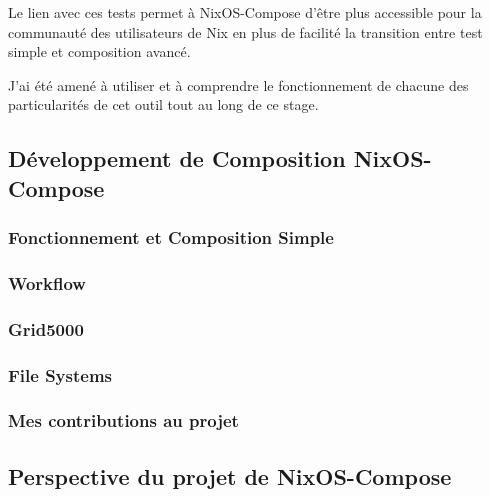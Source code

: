 \documentclass[a4paper,french,12pt, titlepage]{article}
\begin{document}
Le lien avec ces tests permet à NixOS-Compose d'être plus accessible
pour la communauté des utilisateurs de Nix en plus de facilité la
transition entre test simple et composition avancé.\newline

J'ai été amené à utiliser et à comprendre le fonctionnement de chacune
des particularités de cet outil tout au long de ce stage.\newline

\newpage

\hypertarget{duxe9veloppement-de-composition-nixos-compose}{%
\subsection{Développement de Composition
NixOS-Compose}\label{duxe9veloppement-de-composition-nixos-compose}}

\hypertarget{fonctionnement-et-composition-simple}{%
\subsubsection{Fonctionnement et Composition
Simple}\label{fonctionnement-et-composition-simple}}

\hypertarget{workflow}{%
\subsubsection{Workflow}\label{workflow}}

\hypertarget{grid5000}{%
\subsubsection{Grid5000}\label{grid5000}}

\hypertarget{file-systems}{%
\subsubsection{File Systems}\label{file-systems}}

\hypertarget{mes-contributions-au-projet}{%
\subsubsection{Mes contributions au
projet}\label{mes-contributions-au-projet}}

\newpage

\hypertarget{perspective-du-projet-de-nixos-compose}{%
\subsection{Perspective du projet de
NixOS-Compose}\label{perspective-du-projet-de-nixos-compose}}
\end{document}
